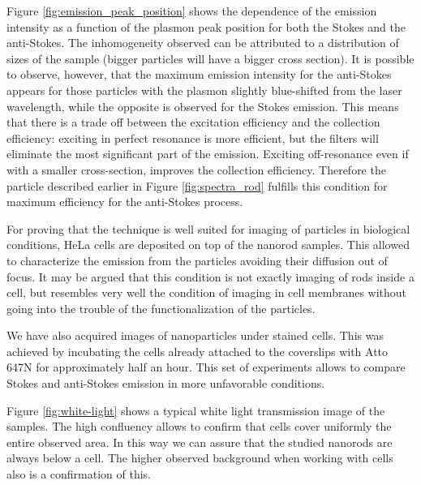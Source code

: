 \documentclass[journal=nalefd,manuscript=letter]{achemso}
\begin{document}
Figure \ref{fig:emission_peak_position} shows the dependence
of the emission intensity as a function of the plasmon peak position for both
the Stokes and the anti-Stokes. The inhomogeneity observed can be attributed to
a distribution of sizes of the sample (bigger particles will have a bigger cross
section). It is possible to observe, however, that the maximum emission
intensity for the anti-Stokes appears for those particles with the plasmon
slightly blue-shifted from the laser wavelength, while the opposite is observed
for the Stokes emission. This means that there is a trade off between the
excitation efficiency and the collection efficiency: exciting in perfect
resonance is more efficient, but the filters will eliminate the most significant
part of the emission. Exciting off-resonance even if with a smaller
cross-section, improves the collection efficiency. Therefore the particle
described earlier in Figure \ref{fig:spectra_rod} fulfills this condition for
maximum efficiency for the anti-Stokes process.

For proving that the technique is well suited for imaging of particles in
biological conditions, HeLa cells are deposited on top of the nanorod samples.
This allowed to characterize the emission from the particles avoiding their
diffusion out of focus. It may be argued that this condition is not exactly
imaging of rods inside a cell, but resembles very well the condition of imaging in cell
membranes without going into the trouble of the functionalization of the
particles. 

We have also acquired images of nanoparticles under stained cells. This was
achieved by incubating the cells already attached to the coverslips with Atto
647N for approximately half an hour. This set of experiments allows to compare
Stokes and anti-Stokes emission in more unfavorable conditions.

Figure \ref{fig:white-light} shows a typical white light transmission image of
the samples. The high confluency allows to confirm that cells cover uniformly
the entire observed area. In this way we can assure that the studied nanorods
are always below a cell. The higher observed background when working with cells
also is a confirmation of this.
\end{document}
